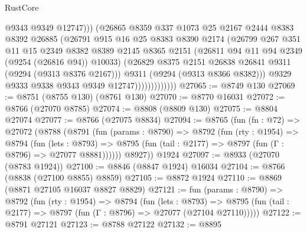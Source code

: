\begin{lexlean}{RustCore}
\begin{coremodule}
                                @9343
                                @9349
                                @12747)))
                          (@26865
                            @8359
                            @337
                            @1073
                            @25
                            @2167
                            @2444
                            @8383
                            @8392
                            @26885
                            (@26791
                              @915
                              @16
                              @25
                              @8383
                              @8390
                              @2174
                              (@26799
                                @267
                                @351
                                @11
                                @15
                                @2349
                                @8382
                                @8389
                                @2145
                                @8365
                                @2151
                                (@26811 @94 @11 @94 @2349 (@9254 (@26816 @94)) @10033)
                                (@26829 @8375 @2151 @26838 @26841 @9311 (@9294 (@9313 @8376 @2167)))
                                @9311
                                (@9294 (@9313 @8366 @8382)))
                              @9329
                              @9333
                              @9338
                              @9343
                              @9349
                              @12747)))))))))))))
@27065 := @8749 @130
@27069 := @8751 (@8755 @130) (@8761 @130)
@27070 := @8770 @16031
@27072 := @8766 (@27070 @8785)
@27074 := @8808 (@8809 @130)
@27075 := @8804 @27074
@27077 := @8766 (@27075 @8834)
@27094 := @8765
    (fun (fn : @72) =>
    @27072
      (@8788
        (@8791
          (fun (params : @8790) =>
          @8792
            (fun (rty : @1954) =>
            @8794
              (fun (lets : @8793) =>
              @8795 (fun (tail : @2177) => @8797 (fun (Γ : @8796) => @27077 @8881))))))
        @8927))
    @1924
@27097 := @8933 (@27070 (@8783 @1924))
@27100 := @8846 (@8847 @1924) @16034
@27104 := @8766 (@8838 (@27100 @8855) @8859)
@27105 := @8872 @1924
@27110 := @8869 (@8871 @27105 @16037 @8827 @8829)
@27121 := fun (params : @8790) =>
  @8792
    (fun (rty : @1954) =>
    @8794
      (fun (lets : @8793) =>
      @8795 (fun (tail : @2177) => @8797 (fun (Γ : @8796) => @27077 (@27104 @27110)))))
@27122 := @8791 @27121
@27123 := @8788 @27122
@27132 := @8895

\end{coremodule}
\end{lexlean}

